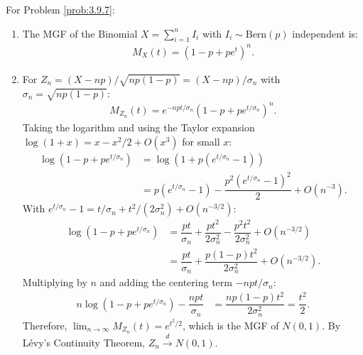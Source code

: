 \begin{solucion}
	\label{sol:3.9.7}
	For Problem \ref{prob:3.9.7}:
	\begin{enumerate}
		\item The MGF of the Binomial $X = \sum_{i=1}^{n} I_{i}$ with $I_{i} \sim \text{Bern}(p)$ independent is:
		\begin{align*}
			M_{X}(t) = (1 - p + p e^{t})^{n}.
		\end{align*}
		\item For $Z_{n} = (X - np)/\sqrt{np(1-p)} = (X - np)/\sigma_{n}$ with $\sigma_{n} = \sqrt{np(1-p)}$:
		\begin{align*}
			M_{Z_{n}}(t) = e^{-npt/\sigma_{n}} (1 - p + p e^{t/\sigma_{n}})^{n}.
		\end{align*}
		Taking the logarithm and using the Taylor expansion $\log(1 + x) = x - x^{2}/2 + O(x^{3})$ for small $x$:
		\begin{align*}
			\log(1 - p + p e^{t/\sigma_{n}}) &= \log(1 + p(e^{t/\sigma_{n}} - 1)) \\
			&= p(e^{t/\sigma_{n}} - 1) - \dfrac{p^{2}(e^{t/\sigma_{n}} - 1)^{2}}{2} + O(n^{-3}).
		\end{align*}
		With $e^{t/\sigma_{n}} - 1 = t/\sigma_{n} + t^{2}/(2\sigma_{n}^{2}) + O(n^{-3/2})$:
		\begin{align*}
			\log(1 - p + p e^{t/\sigma_{n}}) &= \dfrac{pt}{\sigma_{n}} + \dfrac{pt^{2}}{2\sigma_{n}^{2}} - \dfrac{p^{2}t^{2}}{2\sigma_{n}^{2}} + O(n^{-3/2}) \\
			&= \dfrac{pt}{\sigma_{n}} + \dfrac{p(1-p)t^{2}}{2\sigma_{n}^{2}} + O(n^{-3/2}).
		\end{align*}
		Multiplying by $n$ and adding the centering term $-npt/\sigma_{n}$:
		\begin{align*}
			n \log(1 - p + p e^{t/\sigma_{n}}) - \dfrac{npt}{\sigma_{n}} &= \dfrac{np(1-p)t^{2}}{2\sigma_{n}^{2}} = \dfrac{t^{2}}{2}.
		\end{align*}
		Therefore, $\lim_{n \to \infty} M_{Z_{n}}(t) = e^{t^{2}/2}$, which is the MGF of $N(0, 1)$. By Lévy's Continuity Theorem, $Z_{n} \xrightarrow{d} N(0, 1)$. \qedhere
	\end{enumerate}
\end{solucion}

